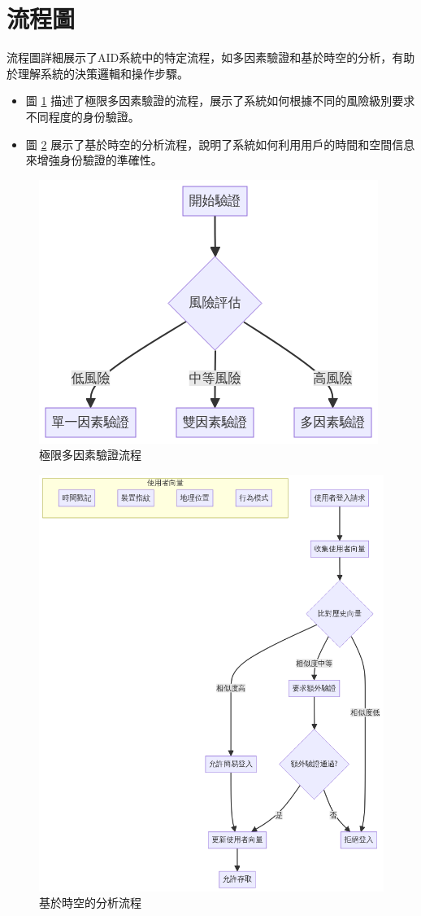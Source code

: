 \section{流程圖}
流程圖詳細展示了AID系統中的特定流程，如多因素驗證和基於時空的分析，有助於理解系統的決策邏輯和操作步驟。
\begin{itemize}
  \item 圖 \ref{fig:appendix-emfa} 描述了極限多因素驗證的流程，展示了系統如何根據不同的風險級別要求不同程度的身份驗證。
  \item 圖 \ref{fig:appendix-time-space-analysis} 展示了基於時空的分析流程，說明了系統如何利用用戶的時間和空間信息來增強身份驗證的準確性。
\end{itemize}
\begin{figure}[p]
  \centering
  \includegraphics[width=\linewidth]{figures/EMFA.png}
  \caption{極限多因素驗證流程}
  \label{fig:appendix-emfa}
\end{figure}
\clearpage
\begin{figure}[p]
  \centering
  \includegraphics[width=\linewidth]{figures/time-space-analysis-uml.png}
  \caption{基於時空的分析流程}
  \label{fig:appendix-time-space-analysis}
\end{figure}